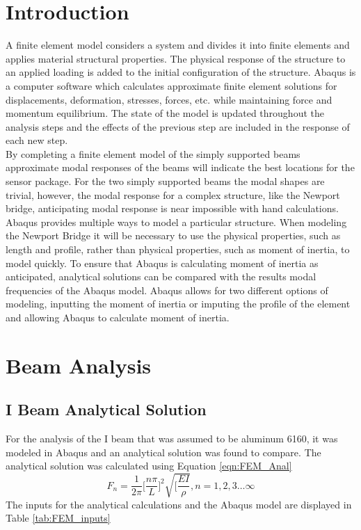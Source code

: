 \section{Introduction}

\indent A finite element model considers a system and divides it into finite elements and applies material structural properties. The physical response of
the structure to an applied loading is added to the initial configuration of the structure. Abaqus is a computer software which calculates approximate
finite element solutions for displacements, deformation, stresses, forces, etc. while maintaining force and momentum equilibrium. The state of the model
is updated throughout the analysis steps and the effects of the previous step are included in the response of each new step. \\
\indent By completing a finite element model of the simply supported beams approximate modal responses of the beams will indicate the best locations for
the sensor package. For the two simply supported beams the modal shapes are trivial, however, the modal response for a complex structure, like the Newport
bridge, anticipating modal response is near impossible with hand calculations. \\
\indent Abaqus provides multiple ways to model a particular structure. When modeling the Newport Bridge it will be necessary to use the physical
properties, such as length and profile, rather than physical properties, such as moment of inertia, to model quickly. To ensure that Abaqus is calculating
moment of inertia as anticipated, analytical solutions can be compared with the results modal frequencies of the Abaqus model. Abaqus allows for two
different options of modeling, inputting the moment of inertia or imputing the profile of the element and allowing Abaqus to calculate moment of
inertia. \\

\section{Beam Analysis}
\subsection{I Beam Analytical Solution}
\indent For the analysis of the I beam that was assumed to be aluminum 6160, it was modeled in Abaqus and an analytical solution was found to compare. The
analytical solution was calculated using Equation \ref{eqn:FEM_Anal}\\
\begin{equation}
F_{n}=\frac{1}{2\pi}\biggl[\frac{n \pi}{L} \biggr]^{2}\sqrt{[\frac{EI}{\rho}} , n=1,2,3\dots\infty
\label{eqn:FEM_Anal}
\end{equation}
\noindent The inputs for the analytical calculations and the Abaqus model are displayed in Table \ref{tab:FEM_inputs}


